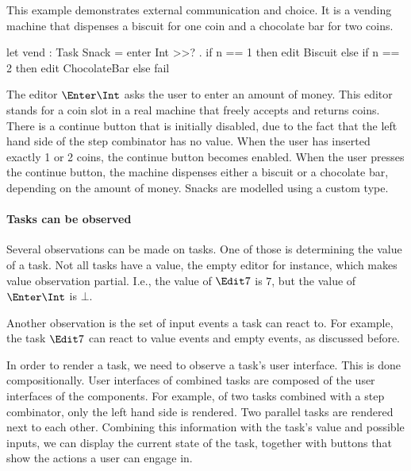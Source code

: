 \begin{example}
\label{Vending machine}

This example demonstrates external communication and choice.
It is a vending machine that dispenses a biscuit for one coin and a chocolate bar for two coins.
\begin{TASK}
  let vend : Task Snack = enter Int >>? \n. if n == 1 then edit Biscuit
    else if n == 2 then edit ChocolateBar else fail
\end{TASK}
The editor $\Enter \Int$ asks the user to enter an amount of money.
This editor stands for a coin slot in a real machine that freely accepts and returns coins.
There is a continue button that is initially disabled, due to the fact that the left hand side of the step combinator has no value.
When the user has inserted exactly 1 or 2 coins, the continue button becomes enabled.
When the user presses the continue button, the machine dispenses either a biscuit or a chocolate bar, depending on the amount of money.
Snacks are modelled using a custom type.

\end{example}



\paragraph{Tasks can be observed}

Several observations can be made on tasks.
One of those is determining the value of a task.
Not all tasks have a value, the empty editor for instance, which makes value observation partial.
I.e., the value of $\Edit 7$ is $7$, but the value of $\Enter \Int$ is $\bot$.

Another observation is the set of input events a task can react to.
For example, the task $\Edit 7$ can react to value events and empty events, as discussed before.

In order to render a task, we need to observe a task's user interface.
This is done compositionally.
User interfaces of combined tasks are composed of the user interfaces of the components.
For example, of two tasks combined with a step combinator, only the left hand side is rendered.
Two parallel tasks are rendered next to each other.
Combining this information with the task's value and possible inputs,
we can display the current state of the task,
together with buttons that show the actions a user can engage in.

